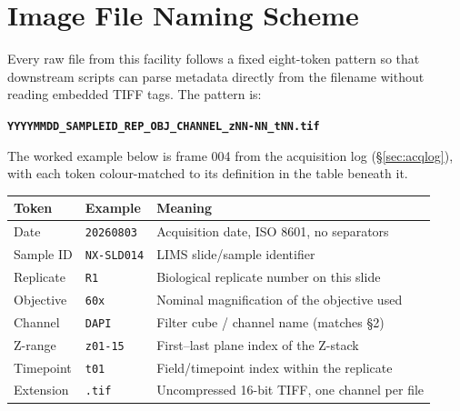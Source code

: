 \section{Image File Naming Scheme}

Every raw file from this facility follows a fixed eight-token pattern so that
downstream scripts can parse metadata directly from the filename without
reading embedded TIFF tags. The pattern is:

\begin{center}
\texttt{\textbf{YYYYMMDD\_SAMPLEID\_REP\_OBJ\_CHANNEL\_zNN-NN\_tNN.tif}}
\end{center}

The worked example below is frame 004 from the acquisition log
(\S\ref{sec:acqlog}), with each token colour-matched to its definition in
the table beneath it.

\begin{center}
\end{center}

\begin{center}
\renewcommand{\arraystretch}{1.25}
\begin{tabular}{@{}l l p{6.4cm}@{}}
\toprule
\rowcolor{inkslate}
\textcolor{paperwhite}{\textbf{Token}} & \textcolor{paperwhite}{\textbf{Example}} & \textcolor{paperwhite}{\textbf{Meaning}} \\
\midrule
Date          & \texttt{20260803}  & Acquisition date, ISO 8601, no separators \\
Sample ID     & \texttt{NX-SLD014} & LIMS slide/sample identifier \\
\rowcolor{fluorgreen!12}
Replicate     & \texttt{R1}         & Biological replicate number on this slide \\
Objective     & \texttt{60x}        & Nominal magnification of the objective used \\
\rowcolor{fluorred!12}
Channel       & \texttt{DAPI}       & Filter cube / channel name (matches \S2) \\
Z-range       & \texttt{z01-15}     & First--last plane index of the Z-stack \\
\rowcolor{fluorfar!12}
Timepoint     & \texttt{t01}        & Field/timepoint index within the replicate \\
Extension     & \texttt{.tif}       & Uncompressed 16-bit TIFF, one channel per file \\
\bottomrule
\end{tabular}
\end{center}

